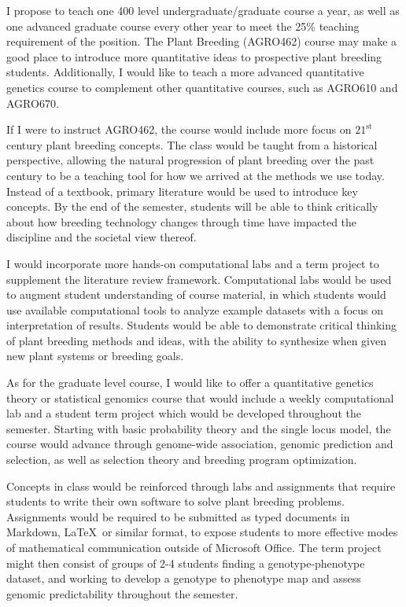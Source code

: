 \documentclass[11pt]{article}
\begin{document}
I propose to teach one 400 level undergraduate/graduate course a year, as well as one advanced graduate course every other year to meet the 25\% teaching requirement of the position. The Plant Breeding (AGRO462) course may make a good place to introduce more quantitative ideas to prospective plant breeding students. Additionally, I would like to teach a more advanced quantitative genetics course to complement other quantitative courses, such as AGRO610 and AGRO670.

If I were to instruct AGRO462, the course would include more focus on $21^\text{st}$ century plant breeding concepts. The class would be taught from a historical perspective, allowing the natural progression of plant breeding over the past century to be a teaching tool for how we arrived at the methods we use today. Instead of a textbook, primary literature would be used to introduce key concepts. By the end of the semester, students will be able to think critically about how breeding technology changes through time have impacted the discipline and the societal view thereof. 

I would incorporate more hands-on computational labs and a term project to supplement the literature review framework. Computational labs would be used to augment student understanding of course material, in which students would use available computational tools to analyze example datasets with a focus on interpretation of results. Students would be able to demonstrate critical thinking of plant breeding methods and ideas, with the ability to synthesize when given new plant systems or breeding goals. 


As for the graduate level course, I would like to offer a quantitative genetics theory or statistical genomics course that would include a weekly computational lab and a student term project which would be developed throughout the semester. Starting with basic probability theory and the single locus model, the course would advance through genome-wide association, genomic prediction and selection, as well as selection theory and breeding program optimization. 

Concepts in class would be reinforced through labs and assignments that require students to write their own software to solve plant breeding problems. Assignments would be required to be submitted as typed documents in Markdown, \LaTeX\ or similar format, to expose students to more effective modes of mathematical communication outside of Microsoft Office. The term project might then consist of groups of 2-4 students finding a genotype-phenotype dataset, and working to develop a genotype to phenotype map and assess genomic predictability throughout the semester.
\end{document}
